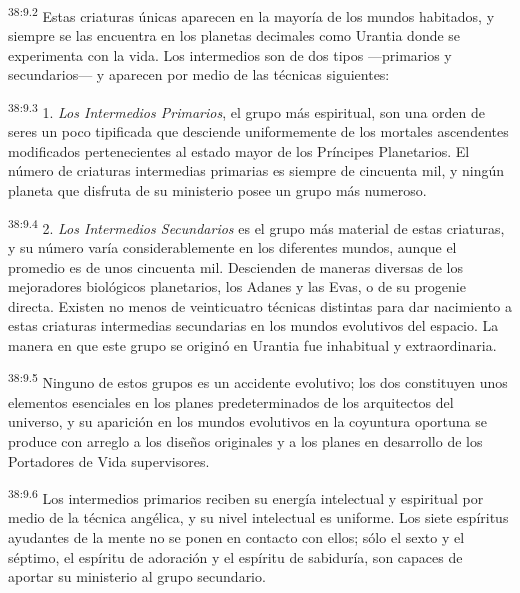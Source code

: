 \par
\textsuperscript{38:9.2} Estas criaturas únicas aparecen en la mayoría de los mundos habitados, y siempre se las encuentra en los planetas decimales como Urantia donde se experimenta con la vida. Los intermedios son de dos tipos ---primarios y secundarios--- y aparecen por medio de las técnicas siguientes:

\par
\textsuperscript{38:9.3} 1. \textit{Los Intermedios Primarios}, el grupo más espiritual, son una orden de seres un poco tipificada que desciende uniformemente de los mortales ascendentes modificados pertenecientes al estado mayor de los Príncipes Planetarios. El número de criaturas intermedias primarias es siempre de cincuenta mil, y ningún planeta que disfruta de su ministerio posee un grupo más numeroso.

\par
\textsuperscript{38:9.4} 2. \textit{Los Intermedios Secundarios} es el grupo más material de estas criaturas, y su número varía considerablemente en los diferentes mundos, aunque el promedio es de unos cincuenta mil. Descienden de maneras diversas de los mejoradores biológicos planetarios, los Adanes y las Evas, o de su progenie directa. Existen no menos de veinticuatro técnicas distintas para dar nacimiento a estas criaturas intermedias secundarias en los mundos evolutivos del espacio. La manera en que este grupo se originó en Urantia fue inhabitual y extraordinaria.

\par
\textsuperscript{38:9.5} Ninguno de estos grupos es un accidente evolutivo; los dos constituyen unos elementos esenciales en los planes predeterminados de los arquitectos del universo, y su aparición en los mundos evolutivos en la coyuntura oportuna se produce con arreglo a los diseños originales y a los planes en desarrollo de los Portadores de Vida supervisores.

\par
\textsuperscript{38:9.6} Los intermedios primarios reciben su energía intelectual y espiritual por medio de la técnica angélica, y su nivel intelectual es uniforme. Los siete espíritus ayudantes de la mente no se ponen en contacto con ellos; sólo el sexto y el séptimo, el espíritu de adoración y el espíritu de sabiduría, son capaces de aportar su ministerio al grupo secundario.

